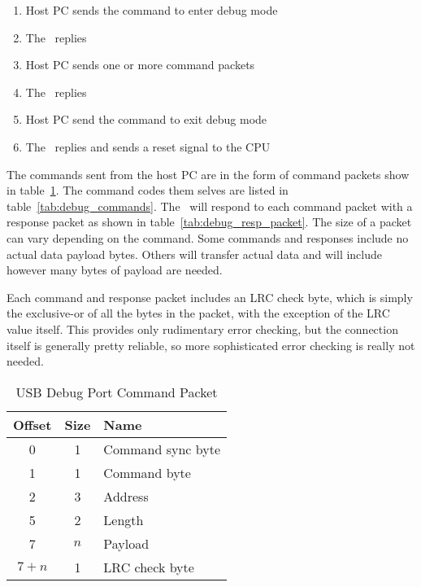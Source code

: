 \begin{enumerate}
    \item Host PC sends the command to enter debug mode
    \item The \jr\ replies
    \item Host PC sends one or more command packets
    \item The \jr\ replies
    \item Host PC send the command to exit debug mode
    \item The \jr\ replies and sends a reset signal to the CPU
\end{enumerate}

The commands sent from the host PC are in the form of command packets show in table~\ref{tab:debug_cmd_packet}. The command codes them selves are listed in table~\ref{tab:debug_commands}. The \jr\ will respond to each command packet with a response packet as shown in table~\ref{tab:debug_resp_packet}. The size of a packet can vary depending on the command. Some commands and responses include no actual data payload bytes. Others will transfer actual data and will include however many bytes of payload are needed.

Each command and response packet includes an LRC check byte, which is simply the exclusive-or of all the bytes in the packet, with the exception of the LRC value itself. This provides only rudimentary error checking, but the connection itself is generally pretty reliable, so more sophisticated error checking is really not needed.

\begin{table}[h]
    \begin{center}
        \begin{tabular}{|c|c|l|} \hline
            Offset & Size & Name \\ \hline\hline
            0 & 1 & Command sync byte\\ \hline
            1 & 1 & Command byte \\ \hline
            2 & 3 & Address \\ \hline
            5 & 2 & Length \\ \hline
            7 & $n$ & Payload \\ \hline
            $7 + n$ & 1 & LRC check byte\\ \hline
        \end{tabular}
    \end{center}
    \caption{USB Debug Port Command Packet}
    \label{tab:debug_cmd_packet}
\end{table}

